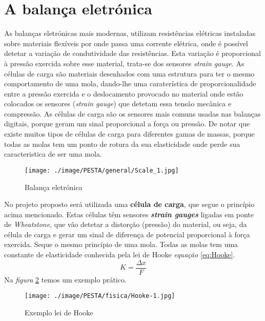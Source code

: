 \section{A balança eletrónica}
As balanças eletrónicas mais modernas, utilizam resistências elétricas instaladas sobre materiais flexíveis por onde passa uma corrente elétrica, onde é possível detetar a variação de condutividade das resistências. Esta variação é proporcional à pressão exercida sobre esse material, trata-se dos sensores \textit{strain gauge}. As células de carga são materiais desenhados com uma estrutura para ter o mesmo comportamento de uma mola, dando-lhe uma caraterística de proporcionalidade entre a pressão exercida e o deslocamento provocado no material onde estão colocados os sensores (\textit{strain gauge}) que detetam essa tensão mecânica e compressão. As células de carga são os sensores mais comuns usadas nas balanças digitais, porque geram um sinal proporcional a força ou pressão. De notar que existe muitos tipos de células de carga para diferentes gamas de massas, porque todas as molas tem um ponto de rotura da sua elasticidade onde perde sua caracteristica de ser uma mola.
\\
\begin{figure}[H]
	\centering
	\texttt{[image: ./image/PESTA/general/Scale\_1.jpg]}
	\caption{Balança eletrónica}
	\label{Scale_1}
\end{figure}
No projeto proposto será utilizada uma \textbf{célula de carga}, que segue o princípio acima mencionado. Estas células têm sensores \textit{\textbf{strain gauges}} ligadas em ponte de \textit{Wheatstone}, que vão detetar a distorção (pressão) do material, ou seja, da célula de carga e gerar um sinal de diferença de potencial proporcional à força exercida. Seque o mesmo princípio de uma mola. Todas as molas tem uma constante de elasticidade conhecida pela lei de Hooke \cite{book-3} \textit{equação} \ref{eq:Hooke}.\\
\begin{equation}
	\label{eq:Hooke}
	K = \frac{\Delta x}{F}
\end{equation}
Na \textit{figura} \ref{Hooke-1} temos um exemplo prático.
\begin{figure}[H]
	\centering
	\texttt{[image: ./image/PESTA/fisica/Hooke-1.jpg]}
	\caption{Exemplo lei de Hooke \cite{book-3}}
	\label{Hooke-1}
\end{figure}
